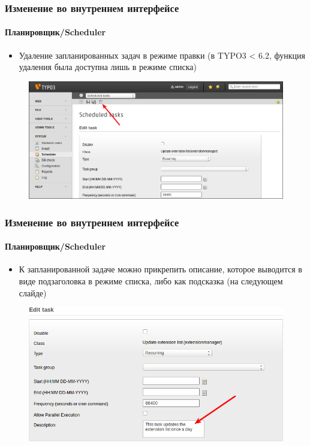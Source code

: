 
\begin{frame}[fragile]
	\frametitle{Изменение во внутреннем интерфейсе}
	\framesubtitle{Планировщик/Scheduler}

	\begin{itemize}
		\item Удаление запланированных задач в режиме правки\newline
			\small(в TYPO3 < 6.2, функция удаления была доступна лишь в режиме списка)\normalsize
	\end{itemize}

	\begin{figure}
		\includegraphics[width=0.95\linewidth]{Images/BackendChanges/DeleteSchedulerTaskInEditView.png}
	\end{figure}

\end{frame}


\begin{frame}[fragile]
	\frametitle{Изменение во внутреннем интерфейсе}
	\framesubtitle{Планировщик/Scheduler}

	\begin{itemize}
		\item К запланированной задаче можно прикрепить описание, которое выводится в виде подзаголовка в режиме списка,
		либо как подсказка (на следующем слайде)
	\end{itemize}

	\begin{figure}
		\includegraphics[width=0.7\linewidth]{Images/BackendChanges/SchedulerTaskDescription.png}
	\end{figure}

\end{frame}

